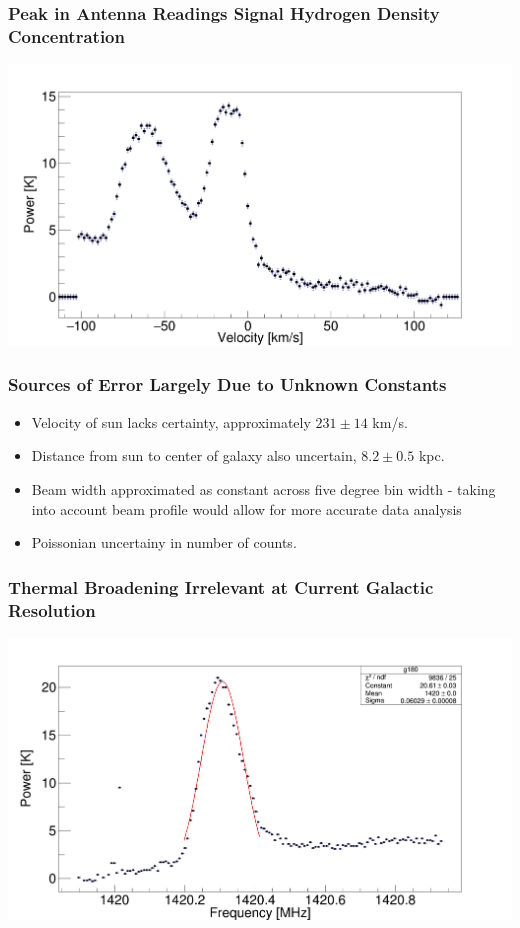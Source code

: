 \documentclass{beamer}
\begin{document}
\begin{frame}
  \frametitle{Peak in Antenna Readings Signal Hydrogen Density Concentration}
  \includegraphics[width=1\textwidth]{data_vel_small.png}
\end{frame}

\begin{frame}
  \frametitle{Sources of Error Largely Due to Unknown Constants}
  \begin{itemize}
    \item Velocity of sun lacks certainty, approximately $231 \pm 14$ km/s. 
      \pause
    \item Distance from sun to center of galaxy also uncertain, $8.2 \pm 0.5$ kpc. 
      \pause
    \item Beam width approximated as constant across five degree bin width - taking into account beam profile would allow for more accurate data analysis
      \pause
    \item Poissonian uncertainy in number of counts.
  \end{itemize}
\end{frame}

\begin{frame}
  \frametitle{Thermal Broadening Irrelevant at Current Galactic Resolution}
  \includegraphics[width=1\textwidth]{thermal_small.png}
\end{frame}
  
\end{document}
